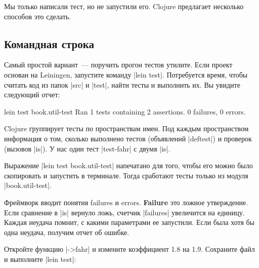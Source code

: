 Мы только написали тест, но не запустили его. Clojure предлагает несколько
способов это сделать.

\subsection{Командная строка}

Самый простой вариант~--- поручить прогон тестов утилите. Если проект основан на
Leiningen, запустите команду \spverb|lein test|.
Потребуется время, чтобы считать код из папок \spverb|src| и \spverb|test|,
найти тесты и выполнить их. Вы увидите следующий отчет:

\begin{english}
  \begin{text}
lein test book.util-test
Ran 1 tests containing 2 assertions.
0 failures, 0 errors.
  \end{text}
\end{english}

Clojure группирует тесты по пространствам имен. Под каждым пространством
информация о том, сколько выполнено тестов (объявлений \spverb|deftest|) и
проверок (вызовов \spverb|is|). У нас один тест \spverb|test-fahr| с двумя
\spverb|is|.

Выражение \spverb|lein test book.util-test| напечатано для того, чтобы его можно
было скопировать и запустить в терминале. Тогда сработают тесты только из модуля
\spverb|book.util-test|.

Фреймворк вводит понятия failures и errors. \textbf{Failure}  это
ложное утверждение. Если сравнение в \spverb|is| вернуло ложь, счетчик
\spverb|failures| увеличится на единицу. Каждая неудача помнит, с какими
параметрами ее запустили. Если была хотя бы одна неудача, получим отчет об
ошибке.

Откройте функцию \spverb|->fahr| и измените коэффициент 1.8 на 1.9. Сохраните
файл и выполните \spverb|lein test|:

\begin{english}
\end{english}

